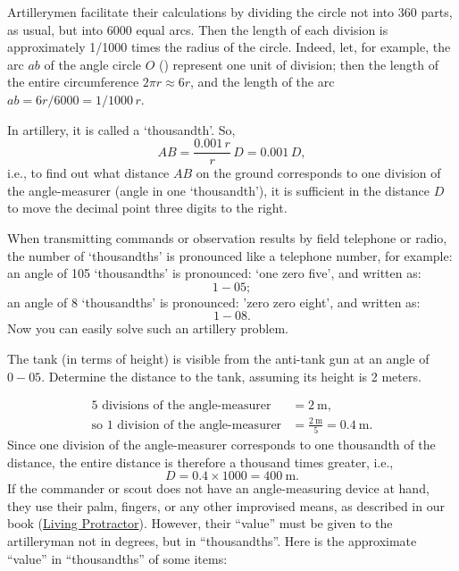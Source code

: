 Artillerymen facilitate their calculations by dividing the circle not into 360 parts, as usual, but into 6000 equal arcs. Then the length of each division is approximately 1/1000 times the radius of the circle. Indeed, let, for example, the arc $ab$ of the angle circle $O$ () represent one unit of division; then the length of the entire circumference $2 \pi r \approx 6r$, and the length of the arc $ab = 6r/6000 = 1/1000 \, r$.

In artillery, it is called a `thousandth'. So,
\begin{equation*}%
AB = \frac{0.001\,r}{r} \, D = 0.001 \, D,
\end{equation*}
i.e., to find out what distance $AB$ on the ground corresponds to one division of the angle-measurer (angle in one `thousandth'), it is sufficient in the distance $D$ to move the decimal point three digits to the right.

When transmitting commands or observation results by field telephone or radio, the number of `thousandths' is pronounced like a telephone number, for example: an angle of 105 `thousandths' is pronounced: `one zero five', and written as: 
\begin{equation*}%
1-05;
\end{equation*}
an angle of 8 `thousandths' is pronounced: 'zero zero eight', and written as:
\begin{equation*}%
1-08.
\end{equation*}
Now you can easily solve such an artillery problem.


\ques The tank (in terms of height) is visible from the anti-tank gun at an angle of $0-05$. Determine the distance to the tank, assuming its height is 2 meters.

\ans 
\begin{align*}%
\text{5 divisions of the angle-measurer} & = \SI{2}{\meter},\\
\text{so 1 division of the angle-measurer} & = \frac{\SI{2}{\meter}}{5} = \SI{0.4}{\meter}. 
\end{align*}
Since one division of the angle-measurer corresponds to one thousandth of the distance, the entire distance is therefore a thousand times greater, i.e.,
\begin{equation*}%
D = 0.4 \times 1000 = \SI{400}{\meter}.
\end{equation*} 
If the commander or scout does not have an angle-measuring device at hand, they use their palm, fingers, or any other improvised means, as described in our book (\hyperref[sec-3.7]{Living Protractor}). However, their ``value'' must be given to the artilleryman not in degrees, but in ``thousandths''. Here is the approximate ``value'' in ``thousandths'' of some items:


